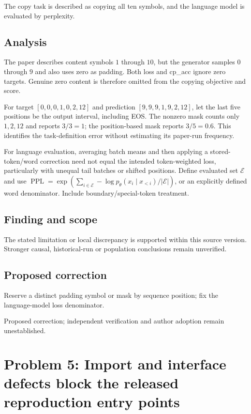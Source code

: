 \documentclass[11pt]{article}
\begin{document}
The copy task is described as copying all ten symbols, and the language model is evaluated by perplexity.

\subsection*{Analysis}

The paper describes content symbols \(1\) through \(10\), but the generator samples \(0\) through \(9\) and also uses zero as padding. Both loss and cp\_acc ignore zero targets. Genuine zero content is therefore omitted from the copying objective and score.

For target \([0,0,0,1,0,2,12]\) and prediction \([9,9,9,1,9,2,12]\), let the last five positions be the output interval, including EOS. The nonzero mask counts only \(1,2,12\) and reports \(3/3=1\); the position-based mask reports \(3/5=0.6\). This identifies the task-definition error without estimating its paper-run frequency.

For language evaluation, averaging batch means and then applying a stored-token/word correction need not equal the intended token-weighted loss, particularly with unequal tail batches or shifted positions. Define evaluated set \(\mathcal E\) and use \(\operatorname{PPL}=\exp(\sum_{i\in\mathcal E}-\log p_\theta(x_i\mid x_{<i})/|\mathcal E|)\), or an explicitly defined word denominator. Include boundary/special-token treatment.

\subsection*{Finding and scope}

The stated limitation or local discrepancy is supported within this source version. Stronger causal, historical-run or population conclusions remain unverified.

\subsection*{Proposed correction}

Reserve a distinct padding symbol or mask by sequence position; fix the language-model loss denominator.

Proposed correction; independent verification and author adoption remain unestablished.

\section*{Problem 5: Import and interface defects block the released reproduction entry points}
\end{document}
